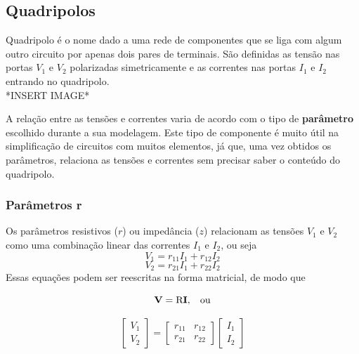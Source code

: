 \documentclass{article}
\numberwithin{equation}{section}
\begin{document}
    \subsection{Quadripolos}
    \label{subsec:quadripolos}
    Quadripolo é o nome dado a uma rede de componentes que se liga com algum outro circuito por apenas dois pares de terminais. São definidas as tensão nas portas $V_{1}$ e $V_{2}$ polarizadas simetricamente e as correntes nas portas $I_{1}$ e $I_{2}$ entrando no quadripolo. \\
    *INSERT IMAGE*

    A relação entre as tensões e correntes varia de acordo com o tipo de \textbf{parâmetro} escolhido durante a sua modelagem. Este tipo de componente é muito útil na simplificação de circuitos com muitos elementos, já que, uma vez obtidos os parâmetros, relaciona as tensões e correntes sem precisar saber o conteúdo do quadripolo.

    \subsubsection{Parâmetros r}
    \label{subsubsec:quadripolosr}
    Os parâmetros resistivos ($r$) ou impedância ($z$) relacionam as tensões $V_{1}$ e $V_{2}$ como uma combinação linear das correntes $I_{1}$ e $I_{2}$, ou seja
    \begin{equation*}
        V_{1}=r_{11}I_{1}+r_{12}I_{2}
    \end{equation*}
    \begin{equation*}
        V_{2}=r_{21}I_{1}+r_{22}I_{2}
    \end{equation*}
    Essas equações podem ser reescritas na forma matricial, de modo que

    \begin{equation*}
        \textbf{V}=\text{R}\textbf{I}, \hspace{0.3cm} \text{ou}
    \end{equation*}

    \begin{equation}
        \begin{bmatrix}
            V_{1} \\
            V_{2}
        \end{bmatrix}
        = %
        \begin{bmatrix}
            r_{11} & r_{12} \\
            r_{21} & r_{22}
        \end{bmatrix}
        \begin{bmatrix}
            I_{1} \\
            I_{2}
        \end{bmatrix}
    \end{equation}
\end{document}
